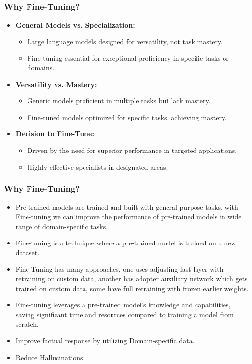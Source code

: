 \begin{frame}[fragile]\frametitle{Why Fine-Tuning?}
  \begin{itemize}
    \item \textbf{General Models vs. Specialization:}
      \begin{itemize}
        \item Large language models designed for versatility, not task mastery.
        \item Fine-tuning essential for exceptional proficiency in specific tasks or domains.
      \end{itemize}
    \item \textbf{Versatility vs. Mastery:}
      \begin{itemize}
        \item Generic models proficient in multiple tasks but lack mastery.
        \item Fine-tuned models optimized for specific tasks, achieving mastery.
      \end{itemize}
    \item \textbf{Decision to Fine-Tune:}
      \begin{itemize}
        \item Driven by the need for superior performance in targeted applications.
        \item Highly effective specialists in designated areas.
      \end{itemize}
  \end{itemize}
\end{frame}


\begin{frame}[fragile]\frametitle{Why Fine-Tuning?}
    \begin{itemize}
        \item Pre-trained models are trained and built with general-purpose tasks, with Fine-tuning we can improve the performance of pre-trained models in wide range of domain-specific tasks.
        \item Fine-tuning is a technique where a pre-trained model is trained on a new dataset.
		\item Fine Tuning has many approaches, one uses adjusting last layer with retraining on custom data, another has adopter auxiliary network which gets trained on custom data, some have full retraining with frozen earlier weights.
		\item Fine-tuning leverages a pre-trained model's knowledge and capabilities, saving significant time and resources compared to training a model from scratch. 
		\item Improve factual response by utilizing Domain-specific data. 
		\item Reduce Hallucinations.
    \end{itemize}
\end{frame}

